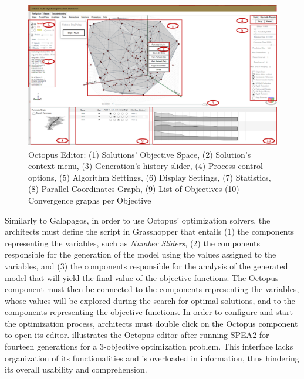 	
\begin{figure}
\centering
\includegraphics[width=1\textwidth]{Images/Background/Octopus/octopus-menu.png}
\caption[Octopus optimization plug-in Editor]{Octopus Editor: (1) Solutions' Objective Space, (2) Solution's context menu, (3) Generation's history slider, (4) Process control options, (5) Algorithm Settings, (6) Display Settings, (7) Statistics, (8) Parallel Coordinates Graph, (9) List of Objectives (10) Convergence graphs per Objective}
\label{fig:octopus}
\end{figure}

Similarly to Galapagos, in order to use Octopus' optimization solvers, the architects must define the script in Grasshopper that entails (1) the components representing the variables, such as \textit{Number Sliders}, (2) the components responsible for the generation of the model using the values assigned to the variables, and (3) the components responsible for the analysis of the generated model that will yield the final value of the objective functions. The Octopus component must then be connected to the components representing the variables, whose values will be explored during the search for optimal solutions, and to the components representing the objective functions. In order to configure and start the optimization process, architects must double click on the Octopus component to open its editor.  illustrates the Octopus editor after running \ac{SPEA}2 for fourteen generations for a 3-objective optimization problem. This interface lacks organization of its functionalities and is overloaded in information, thus hindering its overall usability and comprehension.

